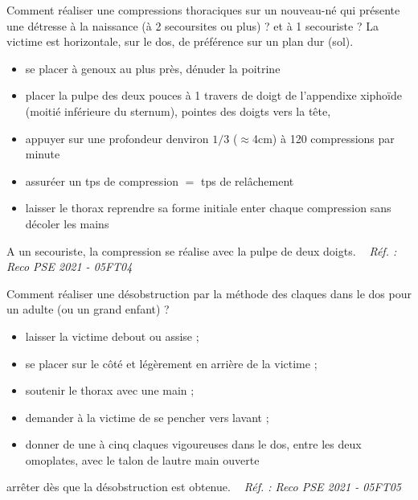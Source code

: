 \documentclass[grid,avery5371,landscape]{flashcards}
\makeatletter
\newcounter{nocarte}
\newcommand{\categ}[1]{%
  \def\@categ{#1}%
  \setcounter{nocarte}{0}%
}
\newcommand{\source}[1]{%
  \medskip
  \itshape%
   ~ \hfill Réf. : #1}
\makeatother
\begin{document}
\color[HTML]{003273}
\categ{PSE}
\begin{flashcard}[geste]{
 Comment réaliser une compressions thoraciques sur un nouveau-né qui présente une détresse à la naissance (à 2 secoursites ou plus) ? et à 1 secouriste ?   }
  La victime est horizontale, sur le dos, de préférence sur un plan dur (sol). \\
\begin{itemize}
\item se placer à genoux au plus près, dénuder la poitrine 
\item placer la pulpe des deux pouces à 1 travers de doigt de l'appendixe xiphoïde (moitié inférieure du sternum), pointes des doigts vers la tête,
\item appuyer sur une profondeur denviron $1/3$ ($\approx$4cm) à 120 compressions par minute 
\item assuréer un tps de compression $=$ tps de relâchement
\item laisser le thorax reprendre sa forme initiale enter chaque compression sans décoler les mains
\end{itemize} 
A un secouriste, la compression se réalise avec la pulpe de deux doigts.
  \source{Reco PSE 2021 - 05FT04}
\end{flashcard}


\color[HTML]{003273}
\categ{PSE}
\begin{flashcard}[geste]{
 Comment réaliser une désobstruction par la méthode des claques dans le dos pour un adulte (ou un grand enfant) ?   }
  \begin{itemize} 
\item laisser la victime debout ou assise ;
\item se placer sur le côté et légèrement en arrière de la victime ;
\item soutenir le thorax avec une main ;
\item demander à la victime de se pencher vers lavant ;
\item donner de une à cinq claques vigoureuses dans le dos, entre les deux omoplates, avec le talon de lautre
main ouverte \end{itemize}
\item arrêter dès que la désobstruction est obtenue.
  \source{Reco PSE 2021 - 05FT05}
\end{flashcard}
\end{document}
